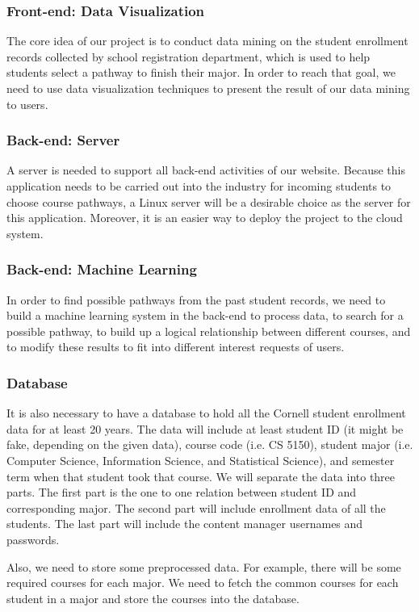 \documentclass{article}
\begin{document}
\subsubsection{Front-end: Data Visualization}
The core idea of our project is to conduct data mining on the student enrollment records collected by school registration department, which is used to help students select a pathway to finish their major. In order to reach that goal, we need to use data visualization techniques to present the result of our data mining to users.
\subsubsection{Back-end: Server}
A server is needed to support all back-end activities of our website. Because this application needs to be carried out into the industry for incoming students to choose course pathways, a Linux server will be a desirable choice as the server for this application. Moreover, it is an easier way to deploy the project to the cloud system.
\subsubsection{Back-end: Machine Learning}
In order to find possible pathways from the past student records, we need to build a machine learning system in the back-end to process data, to search for a possible pathway, to build up a logical relationship between different courses, and to modify these results to fit into different interest requests of users.
\subsubsection{Database}
It is also necessary to have a database to hold all the Cornell student enrollment data for at least 20 years. The data will include at least student ID (it might be fake, depending on the given data), course code (i.e. CS 5150), student major (i.e. Computer Science, Information Science, and Statistical Science), and semester term when that student took that course. We will separate the data into three parts. The first part is the one to one relation between student ID and corresponding major. The second part will include enrollment data of all the students. The last part will include the content manager usernames and passwords.

\vspace{0.4cm}Also, we need to store some preprocessed data. For example, there will be some required courses for each major. We need to fetch the common courses for each student in a major and store the courses into the database.
\end{document}
